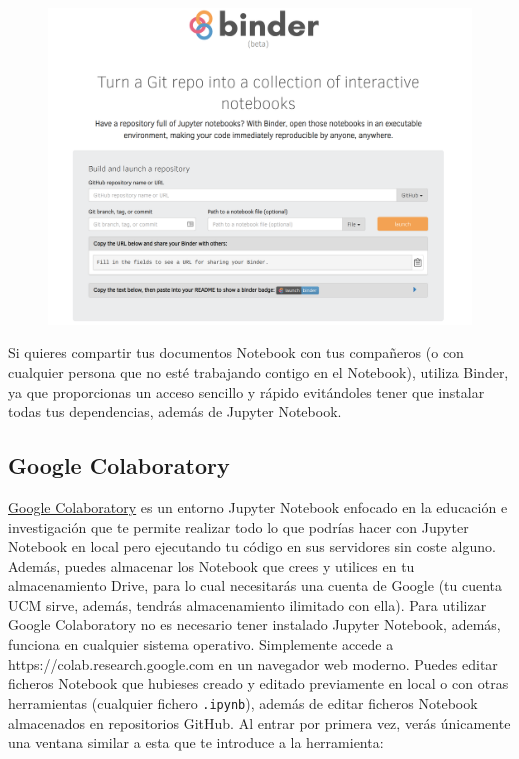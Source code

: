 \documentclass[11pt]{article}
\makeatletter
\def\maxwidth{\ifdim\Gin@nat@width>\linewidth\linewidth
    \else\Gin@nat@width\fi}
\let\Oldincludegraphics\includegraphics
\renewcommand{\includegraphics}[1]{\Oldincludegraphics[width=.8\maxwidth]{#1}}
\makeatother
\begin{document}
    \begin{figure}
\centering
\includegraphics{binder-intro.png}
\caption{}
\end{figure}

    Si quieres compartir tus documentos Notebook con tus compañeros (o con
cualquier persona que no esté trabajando contigo en el Notebook),
utiliza Binder, ya que proporcionas un acceso sencillo y rápido
evitándoles tener que instalar todas tus dependencias, además de Jupyter
Notebook.

    \subsection{Google Colaboratory}\label{google-colaboratory}

    \href{https://colab.research.google.com/}{Google Colaboratory} es un
entorno Jupyter Notebook enfocado en la educación e investigación que te
permite realizar todo lo que podrías hacer con Jupyter Notebook en local
pero ejecutando tu código en sus servidores sin coste alguno. Además,
puedes almacenar los Notebook que crees y utilices en tu almacenamiento
Drive, para lo cual necesitarás una cuenta de Google (tu cuenta UCM
sirve, además, tendrás almacenamiento ilimitado con ella). Para utilizar
Google Colaboratory no es necesario tener instalado Jupyter Notebook,
además, funciona en cualquier sistema operativo. Simplemente accede a
https://colab.research.google.com en un navegador web moderno. Puedes
editar ficheros Notebook que hubieses creado y editado previamente en
local o con otras herramientas (cualquier fichero \texttt{.ipynb}),
además de editar ficheros Notebook almacenados en repositorios GitHub.
Al entrar por primera vez, verás únicamente una ventana similar a esta
que te introduce a la herramienta:
\end{document}
